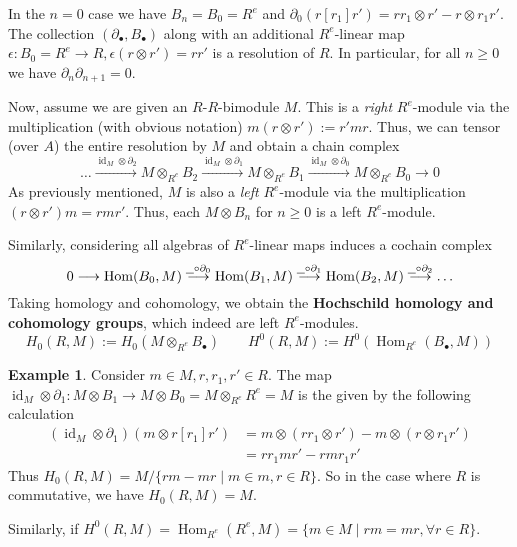 \documentclass[12pt]{article}
\theoremstyle{plain}
\theoremstyle{definition}
\newtheorem{example}[thm]{Example}
\newcommand{\und}[1]{\underline{\hspace{#1 cm}}}
\newcommand{\lto}{\longrightarrow}
\begin{document}
In the $n = 0$ case we have $B_n = B_0 = R^e$ and $\partial_0(r[r_1]r') = rr_1 \otimes r' - r \otimes r_1 r'$. The collection $(\partial_\bullet, B_\bullet)$ along with an additional $R^e$-linear map $\epsilon: B_0 = R^e \lto R, \epsilon (r \otimes r') = rr'$ is a resolution of $R$. In particular, for all $n \geq 0$ we have $\partial_{n}\partial_{n+1} = 0$.

Now, assume we are given an $R$-$R$-bimodule $M$. This is a \emph{right} $R^e$-module via the multiplication (with obvious notation) $m(r \otimes r') := r' m r$. Thus, we can tensor (over $A$) the entire resolution by $M$ and obtain a chain complex
\begin{equation}
	\ldots \stackrel{\operatorname{id}_{M} \otimes \partial_2}{\lto} M \otimes_{R^e}B_{2} \stackrel{\operatorname{id}_{M} \otimes \partial_1}{\lto} M \otimes_{R^e}B_1 \stackrel{\operatorname{id}_{M} \otimes \partial_0}{\lto} M \otimes_{R^e} B_0 \lto 0
	\end{equation}
As previously mentioned, $M$ is also a \emph{left} $R^e$-module via the multiplication $(r \otimes r')m = r m r'$. Thus, each $M \otimes B_n$ for $n \geq 0$ is a left $R^e$-module.

Similarly, considering all algebras of $R^e$-linear maps induces a cochain complex
\begin{equation}
	0 \lto \operatorname{Hom}(B_0, M) \stackrel{\und{0.2} \circ \partial_0}{\lto} \operatorname{Hom}(B_1, M)\stackrel{\und{0.2} \circ \partial_1}{\lto} \operatorname{Hom}(B_2, M) \stackrel{\und{0.2} \circ \partial_2}{\lto} \ldots
	\end{equation}
Taking homology and cohomology, we obtain the \textbf{Hochschild homology and cohomology groups}, which indeed are left $R^e$-modules.
\begin{equation}
	H_0(R,M) := H_0(M \otimes_{R^e} B_\bullet)\qquad H^0(R,M) := H^0(\operatorname{Hom}_{R^e}(B_\bullet, M))
	\end{equation}
\begin{example}
	Consider $m \in M, r,r_1,r' \in R$. The map $\operatorname{id}_M \otimes \partial_1: M \otimes B_1 \lto M \otimes B_0 = M \otimes_{R^e} R^e = M$ is the given by the following calculation
	\begin{align*}
		(\operatorname{id}_M \otimes \partial_1)(m \otimes r[r_1]r') &= m \otimes (rr_1 \otimes r') - m \otimes ( r \otimes r_1r')\\
		&= rr_1 m r' - r m r_1 r'
		\end{align*}
	Thus $H_0(R, M) = M /\{ rm - mr \mid m \in m, r \in R \}$. So in the case where $R$ is commutative, we have $H_0(R,M) = M$.
	
	Similarly, if $H^0(R,M) = \operatorname{Hom}_{R^e}(R^e, M) = \{ m \in M \mid rm = mr,  \forall r \in R \}$.
	\end{example}
\end{document}
